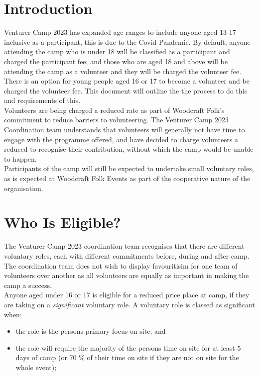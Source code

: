 \documentclass[a4paper, 11pt]{article}
\begin{document}
    \section{Introduction}
    Venturer Camp 2023 has expanded age ranges to include anyone aged 13-17 inclusive as a participant, this is due to the Covid Pandemic. By default, anyone attending the camp who is under 18 will be classified as a participant and charged the participant fee; and those who are aged 18 and above will be attending the camp as a volunteer and they will be charged the volunteer fee. There is an option for young people aged 16 or 17 to become a volunteer and be charged the volunteer fee. This document will outline the the process to do this and requirements of this. \\

    Volunteers are being charged a reduced rate as part of Woodcraft Folk's commitment to reduce barriers to volunteering. The Venturer Camp 2023 Coordination team understands that volunteers will generally not have time to engage with the programme offered, and have decided to charge volunteers a reduced to recognise their contribution, without which the camp would be unable to happen.\\

    Participants of the camp will still be expected to undertake small voluntary roles, as is expected at Woodcraft Folk Events as part of the cooperative nature of the organisation. 

    \section{Who Is Eligible?}
    The Venturer Camp 2023 coordination team recognises that there are different voluntary roles, each with different commitments before, during and after camp. The coordination team does not wish to display favouritisim for one team of volunteers over another as all volunteers are equally as important in making the camp a success.\\

    Anyone aged under 16 or 17 is eligible for a reduced price place at camp, if they are taking on a \textit{significant} voluntary role. A voluntary role is classed as significant when:
    \begin{itemize}
        \item the role is the persons primary focus on site; and
        \item the role will require the majority of the persons time on site for at least 5 days of camp (or 70 \% of their time on site if they are not on site for the whole event);
    \end{itemize}
    
\end{document}
